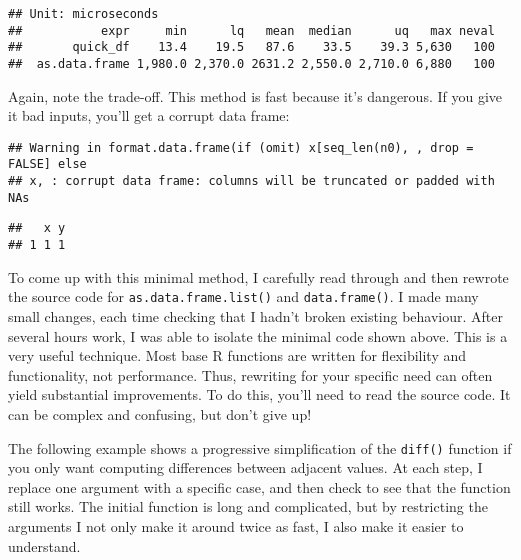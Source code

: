 \begin{verbatim}
## Unit: microseconds
##           expr     min      lq   mean  median      uq   max neval
##       quick_df    13.4    19.5   87.6    33.5    39.3 5,630   100
##  as.data.frame 1,980.0 2,370.0 2631.2 2,550.0 2,710.0 6,880   100
\end{verbatim}

Again, note the trade-off. This method is fast because it's dangerous.
If you give it bad inputs, you'll get a corrupt data frame:

\begin{Shaded}
\begin{Highlighting}[]
\NormalTok{(}\NormalTok{(} \NormalTok{, } \OperatorTok{:}\NormalTok{))}
\end{Highlighting}
\end{Shaded}

\begin{verbatim}
## Warning in format.data.frame(if (omit) x[seq_len(n0), , drop = FALSE] else
## x, : corrupt data frame: columns will be truncated or padded with NAs
\end{verbatim}

\begin{verbatim}
##   x y
## 1 1 1
\end{verbatim}

To come up with this minimal method, I carefully read through and then
rewrote the source code for \texttt{as.data.frame.list()} and
\texttt{data.frame()}. I made many small changes, each time checking
that I hadn't broken existing behaviour. After several hours work, I was
able to isolate the minimal code shown above. This is a very useful
technique. Most base R functions are written for flexibility and
functionality, not performance. Thus, rewriting for your specific need
can often yield substantial improvements. To do this, you'll need to
read the source code. It can be complex and confusing, but don't give
up!

The following example shows a progressive simplification of the
\texttt{diff()} function if you only want computing differences between
adjacent values. At each step, I replace one argument with a specific
case, and then check to see that the function still works. The initial
function is long and complicated, but by restricting the arguments I not
only make it around twice as fast, I also make it easier to understand.

